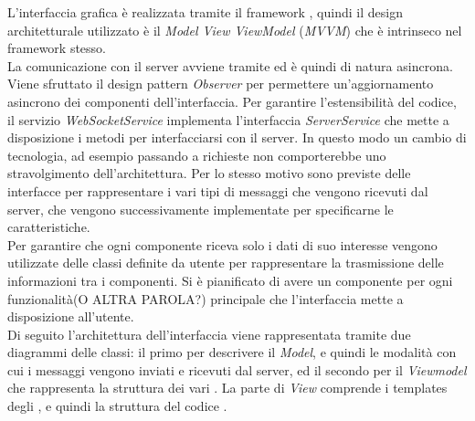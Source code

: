 L'interfaccia grafica è realizzata tramite il framework , quindi il design architetturale utilizzato è il \textit{Model View ViewModel} (\textit{MVVM}) che è intrinseco nel framework stesso. \\
La comunicazione con il server avviene tramite  ed è quindi di natura asincrona. Viene sfruttato il design pattern \textit{Observer} per permettere un'aggiornamento asincrono dei componenti dell'interfaccia. Per garantire l'estensibilità del codice, il servizio \textit{WebSocketService} implementa l'interfaccia \textit{ServerService} che mette a disposizione i metodi per interfacciarsi con il server. In questo modo un cambio di tecnologia, ad esempio passando a richieste  non comporterebbe uno stravolgimento dell'architettura. Per lo stesso motivo sono previste delle interfacce per rappresentare i vari tipi di messaggi che vengono ricevuti dal server, che vengono successivamente implementate per specificarne le caratteristiche. \\
Per garantire che ogni componente riceva solo i dati di suo interesse vengono utilizzate delle classi definite da utente per rappresentare la trasmissione delle informazioni tra i componenti. 
Si è pianificato di avere un componente per ogni funzionalità(O ALTRA PAROLA?) principale che l'interfaccia mette a disposizione all'utente. \\
\newline
Di seguito l'architettura dell'interfaccia viene rappresentata tramite due diagrammi delle classi: il primo per descrivere il \textit{Model}, e quindi le modalità con cui i messaggi vengono inviati e ricevuti dal server, ed il secondo per il \textit{Viewmodel} che rappresenta la struttura dei vari . La parte di \textit{View} comprende i templates degli , e quindi la struttura del codice . \\


